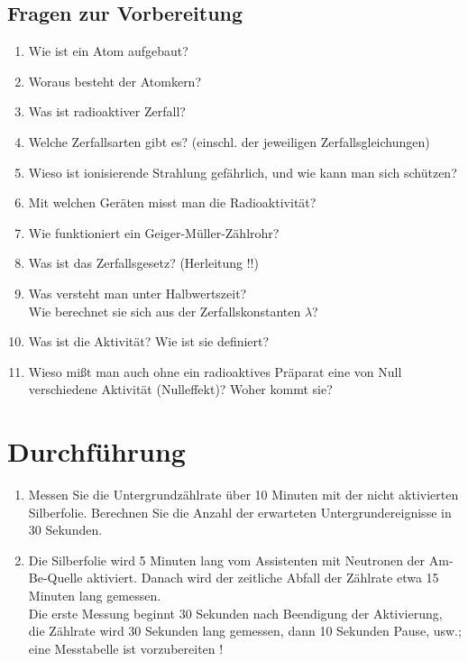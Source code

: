 \begin{tutorhint}
\section{Fragen zur Vorbereitung}

\begin{enumerate}
	\item Wie ist ein Atom aufgebaut?
	\item Woraus besteht der Atomkern?
	\item Was ist radioaktiver Zerfall?
	\item Welche Zerfallsarten gibt es? (einschl. der jeweiligen Zerfallsgleichungen)
	\item Wieso ist ionisierende Strahlung gefährlich, und wie kann man sich schützen?
	\item Mit welchen Geräten misst man die Radioaktivität?
	\item Wie funktioniert ein Geiger-Müller-Zählrohr?
	\item Was ist das Zerfallsgesetz? (Herleitung !!)
	\item Was versteht man unter Halbwertszeit? \\
		Wie berechnet sie sich aus der Zerfallskonstanten $\lambda$?
	\item Was ist die Aktivität? Wie ist sie definiert?
	\item Wieso mißt man auch ohne ein radioaktives Präparat eine von Null verschiedene Aktivität (Nulleffekt)? Woher kommt sie?
\end{enumerate}
\end{tutorhint}

\section{Durchführung} 

\begin{enumerate}
	\item Messen Sie die Untergrundzählrate über 10 Minuten mit der nicht aktivierten Silberfolie. Berechnen Sie die Anzahl der erwarteten Untergrundereignisse in 30 Sekunden.
	\item Die Silberfolie wird 5 Minuten lang vom Assistenten mit Neutronen der Am-Be-Quelle aktiviert. Danach wird der zeitliche Abfall der Zählrate etwa 15 Minuten lang gemessen.\\
	Die erste Messung beginnt 30 Sekunden nach Beendigung der Aktivierung, die Zählrate wird 30 Sekunden lang gemessen, dann 10 Sekunden Pause, usw.; eine Messtabelle ist vorzubereiten !
\end{enumerate}

